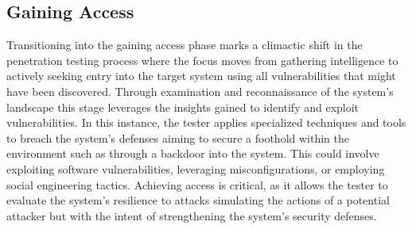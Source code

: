 \documentclass[manuscript,acmsmall,anonymous,review,screen,nonacm=true, authorversion=true]{acmart}
\begin{document}
\subsection{Gaining Access}
Transitioning into the gaining access phase marks a climactic shift in the penetration
testing process where the focus moves from gathering intelligence to actively seeking entry into
the target system using all vulnerabilities that might have been discovered.
Through examination and reconnaissance of the system's landscape this stage leverages the
insights gained to identify and exploit vulnerabilities. In this instance, the tester
applies specialized techniques and tools to breach the system's defenses aiming to secure a
foothold within the environment such as through a backdoor into the system. This
could involve exploiting software vulnerabilities, leveraging misconfigurations, or employing
social engineering tactics. Achieving access is critical, as it allows the tester to
evaluate the system's resilience to attacks simulating the actions of a potential attacker but with
the intent of strengthening the system's security defenses.
\end{document}
